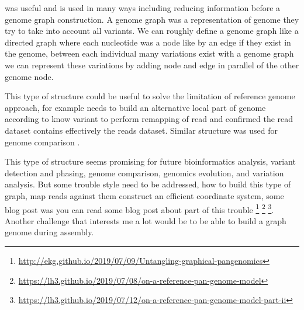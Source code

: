\documentclass[main.tex]{subfiles}
\begin{document}
\bigskip

\fpa was useful and is used in many ways including reducing information before a genome graph construction. A genome graph was a representation of genome they try to take into account all variants. We can roughly define a genome graph like a directed graph where each nucleotide was a node like by an edge if they exist in the genome, between each individual many variations exist with a genome graph we can represent these variations by adding node and edge in parallel of the other genome node.

This type of structure could be useful to solve the limitation of reference genome approach, for example  \cite{whatshap} needs to build an alternative local part of genome according to know variant to perform remapping of read and confirmed the read dataset contains effectively the reads dataset. Similar structure was used for genome comparison  \cite{cactus_graph}.

This type of structure seems promising for future bioinformatics analysis, variant detection and phasing, genome comparison,  genomics evolution, and variation analysis. But some trouble style need to be addressed, how to build this type of graph, map reads against them construct an efficient coordinate system, some blog post was you can read some blog post about part of this trouble \footnote{\url{http://ekg.github.io/2019/07/09/Untangling-graphical-pangenomics}} \footnote{\url{https://lh3.github.io/2019/07/08/on-a-reference-pan-genome-model}} \footnote{\url{https://lh3.github.io/2019/07/12/on-a-reference-pan-genome-model-part-ii}}. Another challenge that interests me a lot would be to be able to build a graph genome during assembly.





\end{document}
